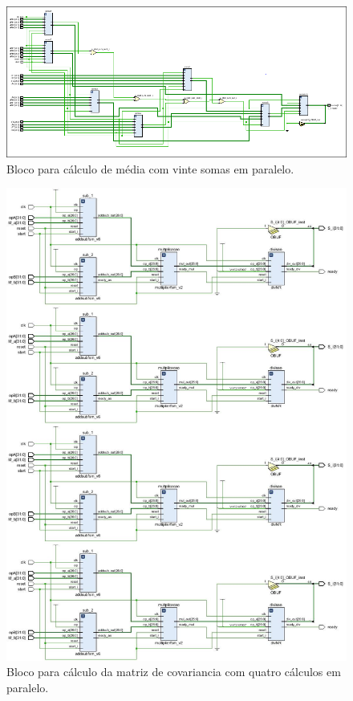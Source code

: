 \begin{figure}[h]
	\centering
	\includegraphics[keepaspectratio=true,scale=0.55]{figuras/rtl_media.png}
	\caption{Bloco para cálculo de média com vinte somas em paralelo.}
	\label{somador}
\end{figure}
\newpage
\begin{figure}[h]
	\centering
	\includegraphics[keepaspectratio=true,scale=0.35]{figuras/rtl_covariancia.png}
	\caption{Bloco para cálculo da matriz de covariancia com quatro cálculos em paralelo.}
	\label{covariancia}
\end{figure}

